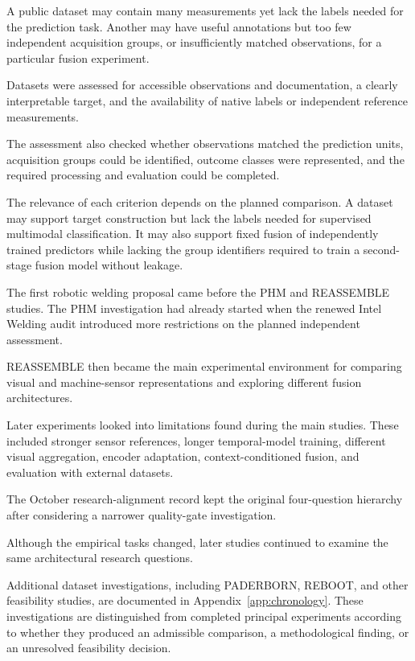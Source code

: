 A public dataset may contain many measurements yet lack the labels needed for the prediction task. Another may have useful annotations but too few independent acquisition groups, or insufficiently matched observations, for a particular fusion experiment.

Datasets were assessed for accessible observations and documentation, a clearly interpretable target, and the availability of native labels or independent reference measurements.

The assessment also checked whether observations matched the prediction units, acquisition groups could be identified, outcome classes were represented, and the required processing and evaluation could be completed.

The relevance of each criterion depends on the planned comparison. A dataset may support target construction but lack the labels needed for supervised multimodal classification. It may also support fixed fusion of independently trained predictors while lacking the group identifiers required to train a second-stage fusion model without leakage.

The first robotic welding proposal came before the PHM and REASSEMBLE studies. The PHM investigation had already started when the renewed Intel Welding audit introduced more restrictions on the planned independent assessment.

REASSEMBLE then became the main experimental environment for comparing visual and machine-sensor representations and exploring different fusion architectures.

Later experiments looked into limitations found during the main studies. These included stronger sensor references, longer temporal-model training, different visual aggregation, encoder adaptation, context-conditioned fusion, and evaluation with external datasets.

The October research-alignment record kept the original four-question hierarchy after considering a narrower quality-gate investigation.

Although the empirical tasks changed, later studies continued to examine the same architectural research questions.

Additional dataset investigations, including PADERBORN, REBOOT, and other feasibility studies, are documented in Appendix~\ref{app:chronology}. These investigations are distinguished from completed principal experiments according to whether they produced an admissible comparison, a methodological finding, or an unresolved feasibility decision.

